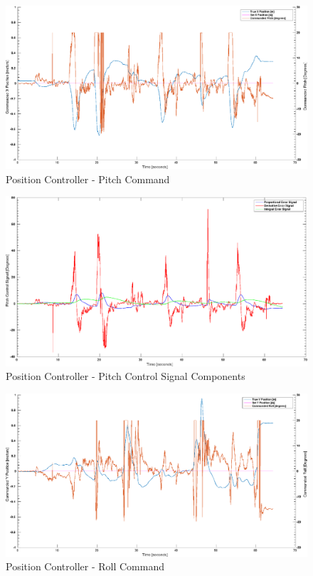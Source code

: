 \documentclass[11pt, twocolumn]{article}
\begin{document}
\begin{figure}
	\centering
	\includegraphics[width=\textwidth]{images/PID_Pitch_x_true_and_obs.eps}
	\caption{Position Controller - Pitch Command}
	\label{fig:pid_roll_command}
\end{figure}

\begin{figure}
	\centering
	\includegraphics[width=\textwidth]{images/PID_Pitch_Controls.eps}
	\caption{Position Controller - Pitch Control Signal Components}
	\label{fig:pid_roll_error}
\end{figure}

\begin{figure}
	\centering
	\includegraphics[width=\textwidth]{images/PID_Roll_y_true_and_obs.eps}
	\caption{Position Controller - Roll Command}
	\label{fig:pid_pitch_command}
\end{figure}
\end{document}
